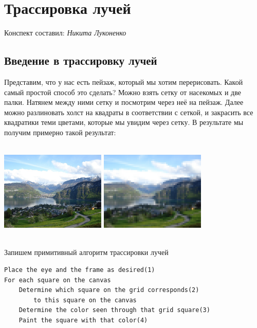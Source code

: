 \section{Трассировка лучей}
\begin{center}
    Конспект составил: \textit{Никита Луконенко}
\end{center}

\subsection{Введение в трассировку лучей}\label{1}

Представим, что у нас есть пейзаж, который мы хотим перерисовать. Какой самый простой способ это сделать?
Можно взять сетку от насекомых и две палки. Натянем между ними сетку и посмотрим через неё на пейзаж. Далее можно разлиновать холст на квадраты в соответствии с сеткой, и закрасить все квадратики теми цветами, которые мы увидим через сетку.
В результате мы получим примерно такой результат:

\includegraphics[width=5cm, height=4.8cm]{image1.png}
\includegraphics[width=5cm, height=4.8cm]{image2.png}

Запишем примитивный алгоритм трассировки лучей
\begin{lstlisting}
Place the eye and the frame as desired(1)
For each square on the canvas
    Determine which square on the grid corresponds(2) 
        to this square on the canvas
    Determine the color seen through that grid square(3)
    Paint the square with that color(4)
\end{lstlisting}

